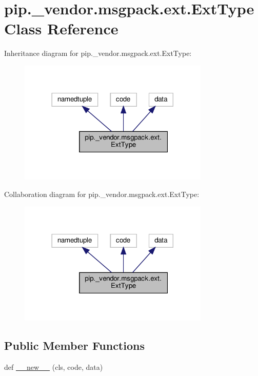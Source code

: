 \hypertarget{classpip_1_1__vendor_1_1msgpack_1_1ext_1_1ExtType}{}\section{pip.\+\_\+vendor.\+msgpack.\+ext.\+Ext\+Type Class Reference}
\label{classpip_1_1__vendor_1_1msgpack_1_1ext_1_1ExtType}


Inheritance diagram for pip.\+\_\+vendor.\+msgpack.\+ext.\+Ext\+Type\+:
\nopagebreak
\begin{figure}[H]
\begin{center}
\leavevmode
\includegraphics[width=257pt]{classpip_1_1__vendor_1_1msgpack_1_1ext_1_1ExtType__inherit__graph}
\end{center}
\end{figure}


Collaboration diagram for pip.\+\_\+vendor.\+msgpack.\+ext.\+Ext\+Type\+:
\nopagebreak
\begin{figure}[H]
\begin{center}
\leavevmode
\includegraphics[width=257pt]{classpip_1_1__vendor_1_1msgpack_1_1ext_1_1ExtType__coll__graph}
\end{center}
\end{figure}
\subsection*{Public Member Functions}
\begin{DoxyCompactItemize}
\item 
def \hyperlink{classpip_1_1__vendor_1_1msgpack_1_1ext_1_1ExtType_a0c4070b7a3692078490834f7bc303448}{\+\_\+\+\_\+new\+\_\+\+\_\+} (cls, code, data)
\end{DoxyCompactItemize}


